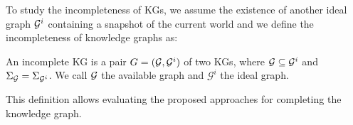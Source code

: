 To study the incompleteness of KGs, we assume the existence of another ideal graph $\mathcal{G}^i$ containing a snapshot of the current world and we define the incompleteness of knowledge graphs as:

\begin{definition} An incomplete KG is a pair
    $G = (\mathcal{G}, \mathcal{G}^i)$ of two KGs, where $\mathcal{G}\subseteq \mathcal{G}^i$ and
    $\Sigma_{\mathcal{G}}=\Sigma_{\mathcal{G}^i}$. We call $\mathcal{G}$ the available
    graph and $\mathcal{G}^i$ the ideal graph.  \end{definition}
    
This definition allows evaluating the proposed approaches for completing the knowledge graph.  
    

